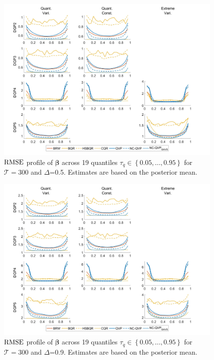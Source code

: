\begin{figure}[H]
    \centering
    \includegraphics[width=0.9\linewidth]{AppFig/CoeffBiasSpecificv3_rho05.jpg}
    \caption{$\operatorname{RMSE}$ profile of $\boldsymbol{\beta}$ across 19 quantiles $\tau_q \in \left\{0.05,\dotsc,0.95\right\}$ for $\mathcal{T}=300$ and $\varDelta$=0.5. Estimates are based on the posterior mean.}
    \label{fig:SpecCoeffBias_rho05}
\end{figure}

\begin{figure}[H]
    \centering
    \includegraphics[width=0.9\linewidth]{AppFig/CoeffBiasSpecificv3_rho09.jpg}
    \caption{$\operatorname{RMSE}$ profile of $\boldsymbol{\beta}$ across 19 quantiles $\tau_q \in \left\{0.05,\dotsc,0.95\right\}$ for $\mathcal{T}=300$ and $\varDelta$=0.9. Estimates are based on the posterior mean.}
    \label{fig:SpecCoeffBias_rho09}
\end{figure}

